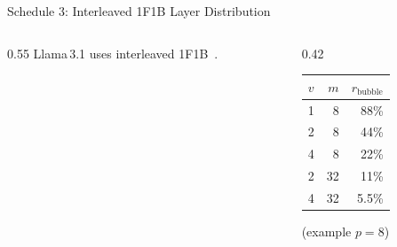 \begin{frame}{Schedule 3: Interleaved 1F1B Layer Distribution}
\begin{columns}
\begin{column}{0.55\textwidth}
      \vspace{0.2em}
      {\small Llama\,3.1 uses interleaved 1F1B~\cite{grattafiori2024llama3}.}
    \end{column}
    \begin{column}{0.42\textwidth}
      {\small
      \begin{tabular}{r r | r}
        \toprule
        $v$ & $m$ & $r_{\text{bubble}}$ \\
        \midrule
        1 & 8 & 88\% \\
        2 & 8 & 44\% \\
        4 & 8 & 22\% \\
        2 & 32 & 11\% \\
        4 & 32 & 5.5\% \\
        \bottomrule
      \end{tabular}
      {\tiny\quad(example $p{=}8$)}}
    \end{column}
  \end{columns}
\end{frame}

